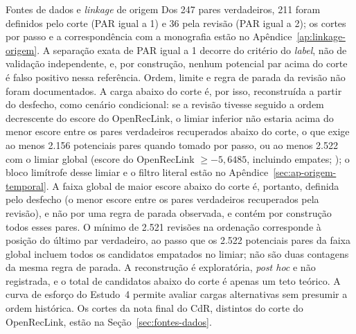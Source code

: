 \begin{chapter}{Fontes de dados e \textit{linkage} de origem}
Dos 247 pares verdadeiros, 211 foram definidos pelo corte (PAR igual a 1) e 36 pela revisão (PAR igual a 2); os cortes por passo e a correspondência com a monografia estão no Apêndice~\ref{ap:linkage-origem}. A separação exata de PAR igual a 1 decorre do critério do \textit{label}, não de validação independente, e, por construção, nenhum potencial par acima do corte é falso positivo nessa referência. Ordem, limite e regra de parada da revisão não foram documentados. A carga abaixo do corte é, por isso, reconstruída a partir do desfecho, como cenário condicional: se a revisão tivesse seguido a ordem decrescente do escore do OpenRecLink, o limiar inferior não estaria acima do menor escore entre os pares verdadeiros recuperados abaixo do corte, o que exige ao menos 2.156 potenciais pares quando tomado por passo, ou ao menos 2.522 com o limiar global (escore do OpenRecLink $\geq -5{,}6485$, incluindo empates; ); o bloco limítrofe desse limiar e o filtro literal estão no Apêndice~\ref{sec:ap-origem-temporal}. A faixa global de maior escore abaixo do corte é, portanto, definida pelo desfecho (o menor escore entre os pares verdadeiros recuperados pela revisão), e não por uma regra de parada observada, e contém por construção todos esses pares. O mínimo de 2.521 revisões na ordenação corresponde à posição do último par verdadeiro, ao passo que os 2.522 potenciais pares da faixa global incluem todos os candidatos empatados no limiar; não são duas contagens da mesma regra de parada. A reconstrução é exploratória, \textit{post hoc} e não registrada, e o total de candidatos abaixo do corte é apenas um teto teórico. A curva de esforço do Estudo~4 permite avaliar cargas alternativas sem presumir a ordem histórica. Os cortes da nota final do CdR, distintos do corte do OpenRecLink, estão na Seção~\ref{sec:fontes-dados}.


\end{chapter}
